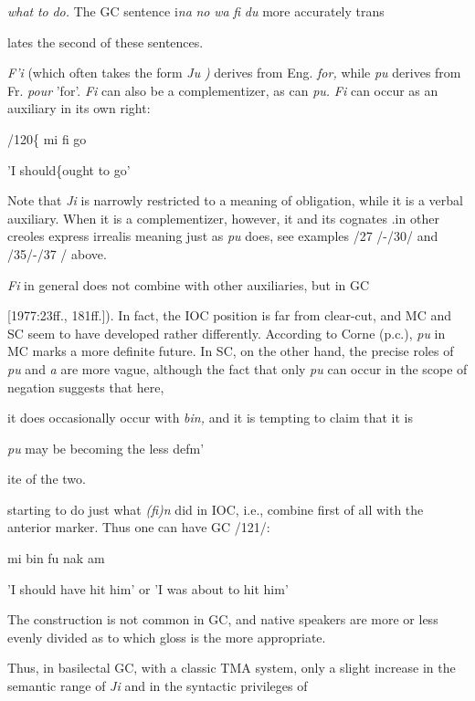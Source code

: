 \textit{what} \textit{to} \textit{do.} The GC sentence i\textit{na} \textit{no} \textit{wa} \textit{fi} \textit{du} more accurately trans\-

lates the second of these sentences.

\textit{F'i} (which often takes the form \textit{Ju} \textit{)} derives from Eng. \textit{for,} while \textit{pu} derives from Fr. \textit{pour} 'for'. \textit{Fi} can also be a complementizer, as can \textit{pu.} \textit{Fi} can occur as an auxiliary in its own right:

/120\{ mi fi go

'I should\{ought to go'


Note that \textit{Ji} is narrowly restricted to a meaning of obligation, while it is a verbal auxiliary. When it is a complementizer, however, it and its cognates .in other creoles express irrealis meaning just as \textit{pu} does, see examples /27 /-/30/ and /35/-/37 / above.

\textit{Fi} in general does not combine with other auxiliaries, but in GC


[1977:23ff., 181ff.]). In fact, the IOC position is far from clear-cut, and MC and SC seem to have developed rather differently. According to Corne (p.c.), \textit{pu} in MC marks a more definite future. In SC, on the other hand, the precise roles of \textit{pu} and \textit{a }are more vague, although the fact that only \textit{pu} can occur in the scope of negation suggests that here,

it does occasionally occur with \textit{bin,} and it is tempting to claim that it is

\textit{pu} may be becoming the less defm'

ite of the two.

starting to do just what \textit{(fi)n} did in IOC, i.e., combine first of all with the anterior marker. Thus one can have GC /121/:

\ea\label{ex:121}
 mi bin fu nak am
\glt
\z

'I should have hit him' or 'I was about to hit him'

The construction is not common in GC, and native speakers are more or less evenly divided as to which gloss is the more appropriate.

Thus, in basilectal GC, with a classic TMA system, only a slight increase in the semantic range of \textit{Ji} and in the syntactic privileges of

